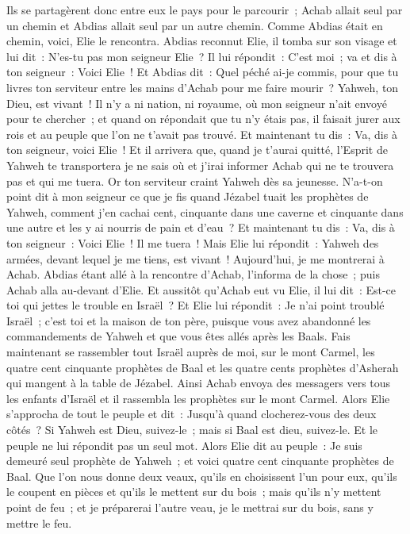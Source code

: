 \begin{multicols}{2}
Ils se partagèrent donc entre eux le pays pour le parcourir~; Achab allait seul par un chemin et Abdias allait seul par un autre chemin.
Comme Abdias était en chemin, voici, Elie le rencontra. Abdias reconnut Elie, il tomba sur son visage et lui dit~: N'es-tu pas mon seigneur Elie~?
Il lui répondit~: C'est moi~; va et dis à ton seigneur~: Voici Elie~!
Et Abdias dit~: Quel péché ai-je commis, pour que tu livres ton serviteur entre les mains d'Achab pour me faire mourir~?
Yahweh, ton Dieu, est vivant~! Il n'y a ni nation, ni royaume, où mon seigneur n'ait envoyé pour te chercher~; et quand on répondait que tu n'y étais pas, il faisait jurer aux rois et au peuple que l'on ne t'avait pas trouvé.
Et maintenant tu dis~: Va, dis à ton seigneur, voici Elie~!
Et il arrivera que, quand je t'aurai quitté, l'Esprit de Yahweh te transportera je ne sais où et j'irai informer Achab qui ne te trouvera pas et qui me tuera. Or ton serviteur craint Yahweh dès sa jeunesse.
N'a-t-on point dit à mon seigneur ce que je fis quand Jézabel tuait les prophètes de Yahweh, comment j'en cachai cent, cinquante dans une caverne et cinquante dans une autre et les y ai nourris de pain et d'eau~?
Et maintenant tu dis~: Va, dis à ton seigneur~: Voici Elie~! Il me tuera~!
Mais Elie lui répondit~: Yahweh des armées, devant lequel je me tiens, est vivant~! Aujourd'hui, je me montrerai à Achab.
Abdias étant allé à la rencontre d'Achab, l'informa de la chose~; puis Achab alla au-devant d'Elie.
Et aussitôt qu'Achab eut vu Elie, il lui dit~: Est-ce toi qui jettes le trouble en Israël~?
Et Elie lui répondit~: Je n'ai point troublé Israël~; c'est toi et la maison de ton père, puisque vous avez abandonné les commandements de Yahweh et que vous êtes allés après les Baals.
Fais maintenant se rassembler tout Israël auprès de moi, sur le mont Carmel, les quatre cent cinquante prophètes de Baal et les quatre cents prophètes d'Asherah qui mangent à la table de Jézabel.
Ainsi Achab envoya des messagers vers tous les enfants d'Israël et il rassembla les prophètes sur le mont Carmel.
Alors Elie s'approcha de tout le peuple et dit~: Jusqu'à quand clocherez-vous des deux côtés~? Si Yahweh est Dieu, suivez-le~; mais si Baal est dieu, suivez-le. Et le peuple ne lui répondit pas un seul mot.
Alors Elie dit au peuple~: Je suis demeuré seul prophète de Yahweh~; et voici quatre cent cinquante prophètes de Baal.
Que l'on nous donne deux veaux, qu'ils en choisissent l'un pour eux, qu'ils le coupent en pièces et qu'ils le mettent sur du bois~; mais qu'ils n'y mettent point de feu~; et je préparerai l'autre veau, je le mettrai sur du bois, sans y mettre le feu.

\end{multicols}
